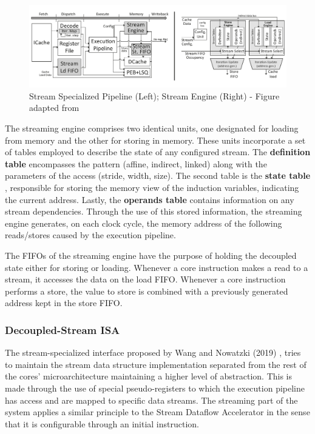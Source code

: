 \begin{figure}[H]
\begin{center}
\includegraphics[width=0.87\linewidth]{images/SD_architeture.pdf}
\caption{Stream Specialized Pipeline (Left); Stream Engine (Right) - Figure adapted from \cite{8980305}}
\label{fig:SD_architeture}
\end{center}
\end{figure}


The streaming engine comprises two identical units, one designated for loading from memory and the other for storing in memory. These units incorporate a set of tables employed to describe the state of any configured stream. The \textbf{definition table }encompasses the pattern (affine, indirect, linked) along with the parameters of the access (stride, width, size). The second table is the \textbf{state table }, responsible for storing the memory view of the induction variables, indicating the current address. Lastly, the \textbf{operands table }contains information on any stream dependencies.
Through the use of this stored information, the streaming engine generates, on each clock cycle, the memory address of the following reads/stores caused by the execution pipeline.

The FIFOs of the streaming engine have the purpose of holding the decoupled state either for storing or loading. Whenever a core instruction makes a read to a stream, it accesses the data on the load FIFO. Whenever a core instruction performs a store, the value to store is combined with a previously generated address kept in the store FIFO.


\subsubsection{Decoupled-Stream ISA}

The stream-specialized interface proposed by Wang and Nowatzki (2019) \cite{8980305}, tries to maintain the stream data structure implementation separated from the rest of the cores' microarchitecture maintaining a higher level of abstraction. This is made through the use of special pseudo-registers to which the execution pipeline has access and are mapped to specific data streams. The streaming part of the system applies a similar principle to the Stream Dataflow Accelerator in the sense that it is configurable through an initial instruction.

